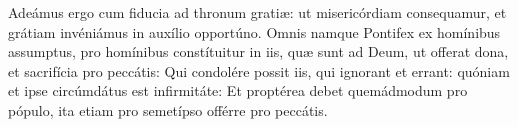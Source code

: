 
Adeámus ergo cum fiducia ad thronum gratiæ: ut misericórdiam consequamur, et grátiam invéniámus in auxílio opportúno.
Omnis namque Pontifex ex homínibus assumptus, pro homínibus constítuitur in iis, quæ sunt ad Deum, ut offerat dona, et sacrifícia pro peccátis:
Qui condolére possit iis, qui ignorant et errant: quóniam et ipse circúmdátus est infirmitáte:
Et proptérea debet quemádmodum pro pópulo, ita etiam pro semetípso offérre pro peccátis.
\par